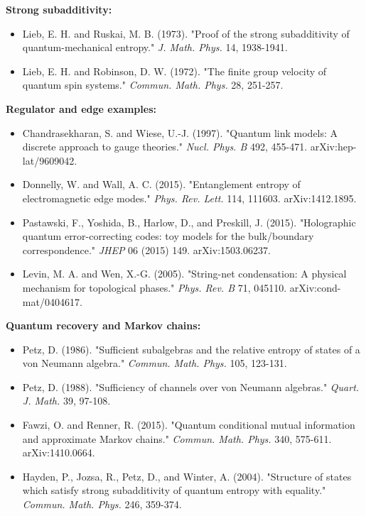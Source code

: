 \textbf{Strong subadditivity:}

\begin{itemize}
\tightlist
\item
  Lieb, E. H. and Ruskai, M. B. (1973). "Proof of the strong subadditivity of quantum-mechanical entropy." \emph{J. Math. Phys.} 14, 1938-1941.
\item
  Lieb, E. H. and Robinson, D. W. (1972). "The finite group velocity of quantum spin systems." \emph{Commun. Math. Phys.} 28, 251-257.
\end{itemize}

\textbf{Regulator and edge examples:}

\begin{itemize}
\tightlist
\item
  Chandrasekharan, S. and Wiese, U.-J. (1997). "Quantum link models: A discrete approach to gauge theories." \emph{Nucl. Phys. B} 492, 455-471. arXiv:hep-lat/9609042.
\item
  Donnelly, W. and Wall, A. C. (2015). "Entanglement entropy of electromagnetic edge modes." \emph{Phys. Rev. Lett.} 114, 111603. arXiv:1412.1895.
\item
  Pastawski, F., Yoshida, B., Harlow, D., and Preskill, J. (2015). "Holographic quantum error-correcting codes: toy models for the bulk/boundary correspondence." \emph{JHEP} 06 (2015) 149. arXiv:1503.06237.
\item
  Levin, M. A. and Wen, X.-G. (2005). "String-net condensation: A physical mechanism for topological phases." \emph{Phys. Rev. B} 71, 045110. arXiv:cond-mat/0404617.
\end{itemize}

\textbf{Quantum recovery and Markov chains:}

\begin{itemize}
\tightlist
\item
  Petz, D. (1986). "Sufficient subalgebras and the relative entropy of states of a von Neumann algebra." \emph{Commun. Math. Phys.} 105, 123-131.
\item
  Petz, D. (1988). "Sufficiency of channels over von Neumann algebras." \emph{Quart. J. Math.} 39, 97-108.
\item
  Fawzi, O. and Renner, R. (2015). "Quantum conditional mutual information and approximate Markov chains." \emph{Commun. Math. Phys.} 340, 575-611. arXiv:1410.0664.
\item
  Hayden, P., Jozsa, R., Petz, D., and Winter, A. (2004). "Structure of states which satisfy strong subadditivity of quantum entropy with equality." \emph{Commun. Math. Phys.} 246, 359-374.
\end{itemize}

